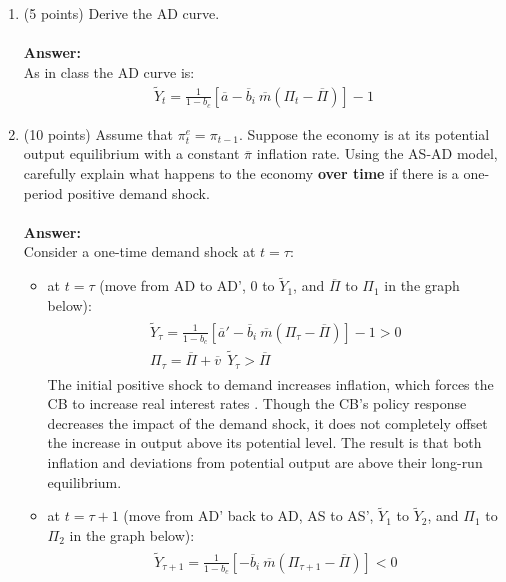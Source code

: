 \documentclass[letterpaper,12pt]{article}
\theoremstyle{dotlessS}
\begin{document}
\begin{enumerate}[label=(\alph*)]
\item (5 points) Derive the AD curve. \\
\\
\textbf{Answer:}\\
As in class the AD curve is:
\begin{eqnarray*}
\widetilde{Y}_t=\frac{1}{1-b_c}\left[\overline{a}-\overline{b}_i \: \overline{m}(\Pi_t-\overline{\Pi})\right]-1
\end{eqnarray*}
\item (10 points) Assume that $\pi^e_t=\pi_{t-1}$. Suppose the economy is at its potential output equilibrium with a constant $\overline{\pi}$ inflation rate. Using the AS-AD model, carefully explain what happens to the economy \textbf{over time} if there is a one-period positive demand shock.\\
\\
\textbf{Answer:}\\
Consider a one-time demand shock at $t=\tau$:
\begin{itemize}
\item at $t=\tau$ (move from AD to AD', 0 to $\widetilde{Y}_1$, and $\overline{\Pi}$ to $\Pi_1$ in the graph below):
\begin{eqnarray*}
\begin{array}{l}
\widetilde{Y}_{\tau}=\frac{1}{1-b_c}\left[\overline{a}' -\overline{b}_i \: \overline{m}(\Pi_{\tau}-\overline{\Pi})\right]-1>0 \\[1.2ex]
\Pi_{\tau}=\overline{\Pi}+\overline{v}\: \: \widetilde{Y}_{\tau} >\overline{\Pi}
\end{array}
\end{eqnarray*}
The initial positive shock to demand increases inflation, which forces the CB to increase real interest rates . Though the CB's policy response decreases the impact of the demand shock, it does not completely offset the increase in output above its potential level. The result is that both inflation and deviations from potential output are above their long-run equilibrium.
\item  at $t=\tau+1$ (move from AD' back to AD, AS to AS',  $\widetilde{Y}_1$ to  $\widetilde{Y}_2$, and $\Pi_1$ to $\Pi_2$ in the graph below):
\begin{eqnarray*}
\begin{array}{l}
\widetilde{Y}_{\tau+1}=\frac{1}{1-b_c}\left[-\overline{b}_i \: \overline{m}(\Pi_{\tau+1}-\overline{\Pi})\right]  < 0 \\[1.2ex]

\end{array}
\end{eqnarray*}
\end{itemize}
\end{enumerate}
\end{document}
